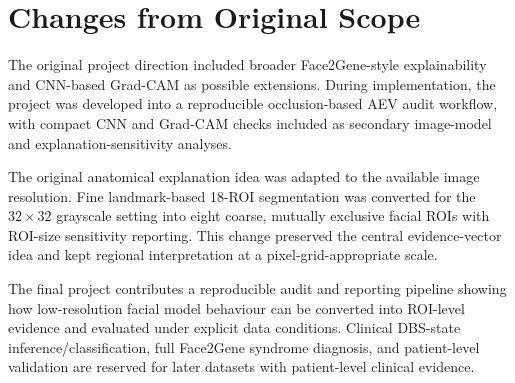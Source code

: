 \documentclass[oneside,12pt]{article}
\begin{document}
\section*{Changes from Original Scope}

The original project direction included broader Face2Gene-style explainability and CNN-based Grad-CAM as possible extensions. During implementation, the project was developed into a reproducible occlusion-based AEV audit workflow, with compact CNN and Grad-CAM checks included as secondary image-model and explanation-sensitivity analyses.

The original anatomical explanation idea was adapted to the available image resolution. Fine landmark-based 18-ROI segmentation was converted for the $32\times32$ grayscale setting into eight coarse, mutually exclusive facial ROIs with ROI-size sensitivity reporting. This change preserved the central evidence-vector idea and kept regional interpretation at a pixel-grid-appropriate scale.

The final project contributes a reproducible audit and reporting pipeline showing how low-resolution facial model behaviour can be converted into ROI-level evidence and evaluated under explicit data conditions. Clinical DBS-state inference/classification, full Face2Gene syndrome diagnosis, and patient-level validation are reserved for later datasets with patient-level clinical evidence.
\end{document}
